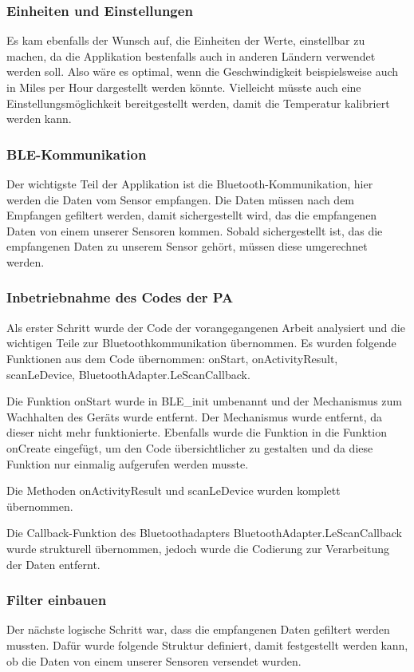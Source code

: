 \subsubsection{Einheiten und Einstellungen}

Es kam ebenfalls der Wunsch auf, die Einheiten der Werte, einstellbar zu machen, da die Applikation bestenfalls auch in anderen Ländern verwendet werden soll. Also wäre es optimal, wenn die Geschwindigkeit beispielsweise auch in Miles per Hour dargestellt werden könnte. Vielleicht müsste auch eine Einstellungsmöglichkeit bereitgestellt werden, damit die Temperatur kalibriert werden kann.

\subsubsection{BLE-Kommunikation}

Der wichtigste Teil der Applikation ist die Bluetooth-Kommunikation, hier werden die Daten vom Sensor empfangen. Die Daten müssen nach dem Empfangen gefiltert werden, damit sichergestellt wird, das die empfangenen Daten von einem unserer Sensoren kommen. Sobald sichergestellt ist, das die empfangenen Daten zu unserem Sensor gehört, müssen diese umgerechnet werden.

\subsubsection{Inbetriebnahme des Codes der PA}

Als erster Schritt wurde der Code der vorangegangenen Arbeit analysiert und die wichtigen Teile zur Bluetoothkommunikation übernommen. Es wurden folgende Funktionen aus dem Code übernommen: onStart, onActivityResult, scanLeDevice, BluetoothAdapter.LeScanCallback.

Die Funktion onStart wurde in BLE\_init umbenannt und der Mechanismus zum Wachhalten des Geräts wurde entfernt. Der Mechanismus wurde entfernt, da dieser nicht mehr funktionierte. Ebenfalls wurde die Funktion in die Funktion onCreate eingefügt, um den Code übersichtlicher zu gestalten und da diese Funktion nur einmalig aufgerufen werden musste.
 
Die Methoden onActivityResult und scanLeDevice wurden komplett übernommen.

Die Callback-Funktion des Bluetoothadapters BluetoothAdapter.LeScanCallback wurde strukturell übernommen, jedoch wurde die Codierung zur Verarbeitung der Daten entfernt.

\subsubsection{Filter einbauen}
Der nächste logische Schritt war, dass die empfangenen Daten gefiltert werden mussten. Dafür wurde folgende Struktur definiert, damit festgestellt werden kann, ob die Daten von einem unserer Sensoren versendet wurden.

